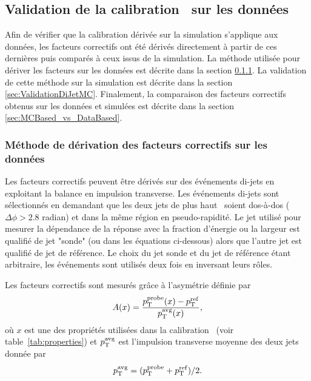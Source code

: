 \subsection{Validation de la calibration \GS~sur les donn\'ees}

Afin de v\'erifier que la calibration d\'eriv\'ee sur la simulation s'applique aux donn\'ees, les facteurs correctifs ont \'et\'e d\'eriv\'es directement \`a partir de ces derni\`eres puis compar\'es \`a ceux issus de la simulation. La m\'ethode utilis\'ee pour d\'eriver les facteurs sur les donn\'ees est d\'ecrite dans la section \ref{sec:DijetBalanceMethod}. La validation de cette m\'ethode sur la simulation est d\'ecrite dans la section \ref{sec:ValidationDiJetMC}. Finalement, la comparaison des facteurs correctifs obtenus sur les donn\'ees et simul\'ees est d\'ecrite dans la section \ref{sec:MCBased_vs_DataBased}.

\subsubsection{M\'ethode de d\'erivation des facteurs correctifs sur les donn\'ees}
\label{sec:DijetBalanceMethod}

Les facteurs correctifs peuvent \^etre d\'eriv\'es sur des \'ev\'enements di-jets en exploitant la balance en impulsion transverse. Les \'ev\'enements di-jets sont s\'electionn\'es en demandant que les deux jets de plus haut \pt~soient dos-\`a-dos ($\Delta \phi > 2.8$ radian) et dans la m\^eme r\'egion en pseudo-rapidit\'e. Le jet utilis\'e pour mesurer la d\'ependance de la r\'eponse avec la fraction d'\'energie ou la largeur est qualifi\'e de jet "sonde" (ou  dans les \'equations ci-dessous) alors que l'autre jet est qualifi\'e de jet de r\'ef\'erence. Le choix du jet sonde et du jet de r\'ef\'erence \'etant arbitraire, les \'ev\'enements sont utilis\'es deux fois en inversant leurs r\^oles.

Les facteurs correctifs sont mesur\'es gr\^ace \`a l'asym\'etrie d\'efinie par 
\begin{equation}
\label{eq:AsymReco}
A(x) = \frac{p_{\mathrm{T}}^{\rm probe}(x) - p_{\mathrm{T}}^{\rm ref}}{p_{\mathrm{T}}^{\rm avg}(x)},
\end{equation}
o\`u $x$ est une des propri\'et\'es utilis\'ees dans la calibration \GS~(voir table~\ref{tab:properties}) et $p_{\mathrm{T}}^{\rm avg}$ est l'impulsion transverse moyenne des deux jets donn\'ee par 
\begin{equation}
p_{\mathrm{T}}^{\rm avg} = (p_{\mathrm{T}}^{\rm probe}+ p_{\mathrm{T}}^{\rm ref})/2. 
\end{equation}

